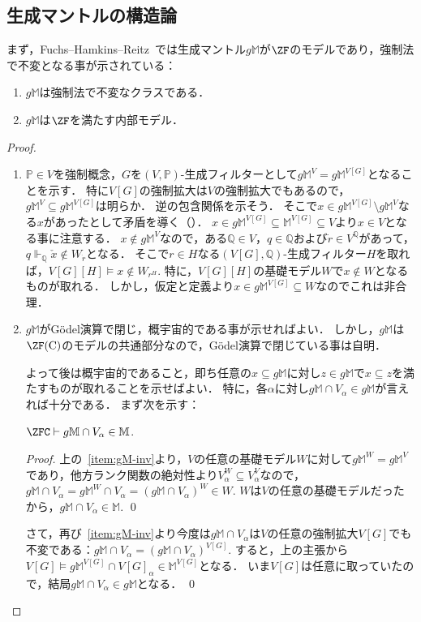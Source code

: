 \documentclass[a4j,leqno]{ltjsarticle}
\renewcommand{\emph}[1]{\textgt{\textsf{#1}}}
\newcommand{\mantle}{\mathbb{M}}
\newcommand{\M}{\mantle}
\newcommand{\gM}{g\mathbb{M}}
\begin{document}
\subsection{生成マントルの構造論}
まず，Fuchs--Hamkins--Reitz~\cite{Fuchs:2014fj}では生成マントル$\gM$が$\ZF$のモデルであり，強制法で不変となる事が示されている：
\begin{theorem}[F--H--R]\label{thm:gM-inv-ZF}
 \begin{enumerate}
  \item\label{item:gM-inv} $\gM$は強制法で不変なクラスである．
  \item $\gM$は$\ZF$を満たす内部モデル．
 \end{enumerate}
\end{theorem}
\begin{proof}
 \begin{enumerate}
  \item $\mathbb{P} \in V$を強制概念，$G$を$(V, \mathbb{P})$-生成フィルターとして$\gM^V = \gM^{V[G]}$となることを示す．
        特に$V[G]$の強制拡大は$V$の強制拡大でもあるので，$\gM^{V} \subseteq \gM^{V[G]}$は明らか．
        逆の包含関係を示そう．
        そこで$x \in \gM^{V[G]} \setminus \gM^V$なる$x$があったとして矛盾を導く（\emph{背理法}）．
        $x \in \gM^{V[G]} \subseteq \M^{V[G]} \subseteq V$より$x \in V$となる事に注意する．
        $x \notin \gM^V$なので，ある$\mathbb{Q} \in V$，$q \in \mathbb{Q}$および$\dot{r} \in V^{\mathbb{Q}}$があって，$q \Vdash_{\mathbb{Q}} \check{x} \notin W_{\dot{r}}$となる．
        そこで$r \in H$なる$(V[G], \mathbb{Q})$-生成フィルター$H$を取れば，$V[G][H] \models x \notin W_{r^{H}}$.
        特に，$V[G][H]$の基礎モデル$W$で$x \notin W$となるものが取れる．
        しかし，仮定と定義より$x \in \gM^{V[G]} \subseteq W$なのでこれは非合理．
  \item $\gM$がG\"{o}del演算で閉じ，概宇宙的である事が示せればよい．
        しかし，$\gM$は$\ZF(\mathrm{C})$のモデルの共通部分なので，G\"{o}del演算で閉じている事は自明．

        よって後は概宇宙的であること，即ち任意の$x \subseteq \gM$に対し$z \in \gM$で$x \subseteq z$を満たすものが取れることを示せばよい．
        特に，各$\alpha$に対し$\gM \cap V_\alpha \in \gM$が言えれば十分である．
        まず次を示す：
        \begin{claim}
         $\ZFC \vdash \gM \cap V_\alpha \in \M$.
        \end{claim}
        \begin{proof}
         上の~\ref{item:gM-inv}より，$V$の任意の基礎モデル$W$に対して$\gM^W = \gM^V$であり，他方ランク関数の絶対性より$V_\alpha^W \subseteq V_\alpha^V$なので，$\gM \cap V_\alpha = \gM^W \cap V_\alpha = (\gM \cap V_\alpha)^W \in W$.
         $W$は$V$の任意の基礎モデルだったから，$\gM \cap V_\alpha \in\M $. \qed
        \end{proof}
        さて，再び~\ref{item:gM-inv}より今度は$\gM \cap V_\alpha$は$V$の任意の強制拡大$V[G]$でも不変である：$\gM \cap V_\alpha = (\gM \cap V_\alpha)^{V[G]}$.
        すると，上の主張から$V[G] \models \gM^{V[G]} \cap V[G]_\alpha \in \M^{V[G]}$となる．
        いま$V[G]$は任意に取っていたので，結局$\gM \cap V_\alpha \in \gM$となる． \qed
 \end{enumerate}
\end{proof}
\end{document}
